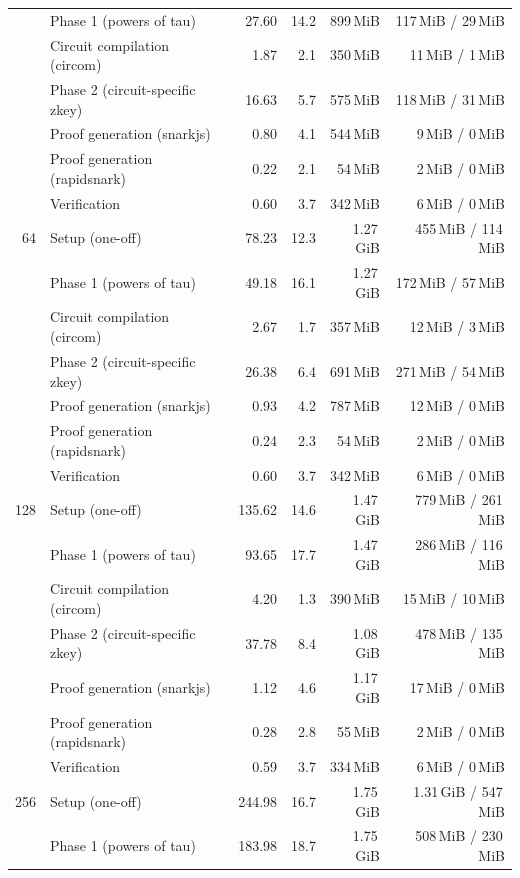 \begin{table}[t]
{\begin{tabular}{|r|l|r|r|r|r|}
 & \quad Phase 1 (powers of tau) & 27.60 & 14.2 & 899\,MiB & 117\,MiB / 29\,MiB \\
 & \quad Circuit compilation (circom) & 1.87 & 2.1 & 350\,MiB & 11\,MiB / 1\,MiB \\
 & \quad Phase 2 (circuit-specific zkey) & 16.63 & 5.7 & 575\,MiB & 118\,MiB / 31\,MiB \\
 & Proof generation (snarkjs) & 0.80 & 4.1 & 544\,MiB & 9\,MiB / 0\,MiB \\
 & Proof generation (rapidsnark) & 0.22 & 2.1 & 54\,MiB & 2\,MiB / 0\,MiB \\
 & Verification & 0.60 & 3.7 & 342\,MiB & 6\,MiB / 0\,MiB \\
\hline
64 & Setup (one-off) & 78.23 & 12.3 & 1.27\,GiB & 455\,MiB / 114\,MiB \\
 & \quad Phase 1 (powers of tau) & 49.18 & 16.1 & 1.27\,GiB & 172\,MiB / 57\,MiB \\
 & \quad Circuit compilation (circom) & 2.67 & 1.7 & 357\,MiB & 12\,MiB / 3\,MiB \\
 & \quad Phase 2 (circuit-specific zkey) & 26.38 & 6.4 & 691\,MiB & 271\,MiB / 54\,MiB \\
 & Proof generation (snarkjs) & 0.93 & 4.2 & 787\,MiB & 12\,MiB / 0\,MiB \\
 & Proof generation (rapidsnark) & 0.24 & 2.3 & 54\,MiB & 2\,MiB / 0\,MiB \\
 & Verification & 0.60 & 3.7 & 342\,MiB & 6\,MiB / 0\,MiB \\
\hline
128 & Setup (one-off) & 135.62 & 14.6 & 1.47\,GiB & 779\,MiB / 261\,MiB \\
 & \quad Phase 1 (powers of tau) & 93.65 & 17.7 & 1.47\,GiB & 286\,MiB / 116\,MiB \\
 & \quad Circuit compilation (circom) & 4.20 & 1.3 & 390\,MiB & 15\,MiB / 10\,MiB \\
 & \quad Phase 2 (circuit-specific zkey) & 37.78 & 8.4 & 1.08\,GiB & 478\,MiB / 135\,MiB \\
 & Proof generation (snarkjs) & 1.12 & 4.6 & 1.17\,GiB & 17\,MiB / 0\,MiB \\
 & Proof generation (rapidsnark) & 0.28 & 2.8 & 55\,MiB & 2\,MiB / 0\,MiB \\
 & Verification & 0.59 & 3.7 & 334\,MiB & 6\,MiB / 0\,MiB \\
\hline
256 & Setup (one-off) & 244.98 & 16.7 & 1.75\,GiB & 1.31\,GiB / 547\,MiB \\
 & \quad Phase 1 (powers of tau) & 183.98 & 18.7 & 1.75\,GiB & 508\,MiB / 230\,MiB \\

\end{tabular}}
\end{table}
